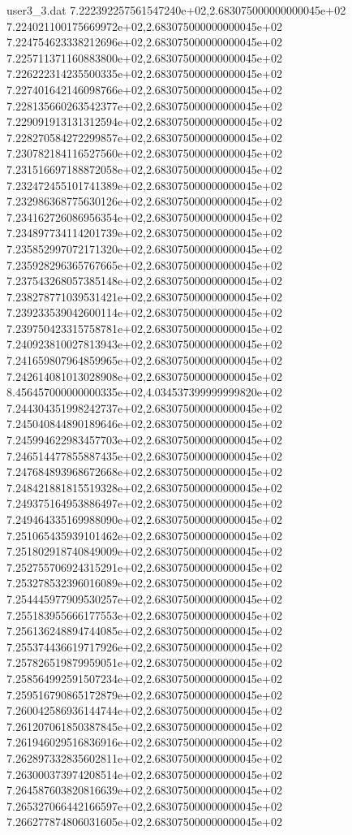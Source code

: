\begin{filecontents}{user3_3.dat}
7.222392257561547240e+02,2.683075000000000045e+02
7.224021100175669972e+02,2.683075000000000045e+02
7.224754623338212696e+02,2.683075000000000045e+02
7.225711371160883800e+02,2.683075000000000045e+02
7.226222314235500335e+02,2.683075000000000045e+02
7.227401642146098766e+02,2.683075000000000045e+02
7.228135660263542377e+02,2.683075000000000045e+02
7.229091913131312594e+02,2.683075000000000045e+02
7.228270584272299857e+02,2.683075000000000045e+02
7.230782184116527560e+02,2.683075000000000045e+02
7.231516697188872058e+02,2.683075000000000045e+02
7.232472455101741389e+02,2.683075000000000045e+02
7.232986368775630126e+02,2.683075000000000045e+02
7.234162726086956354e+02,2.683075000000000045e+02
7.234897734114201739e+02,2.683075000000000045e+02
7.235852997072171320e+02,2.683075000000000045e+02
7.235928296365767665e+02,2.683075000000000045e+02
7.237543268057385148e+02,2.683075000000000045e+02
7.238278771039531421e+02,2.683075000000000045e+02
7.239233539042600114e+02,2.683075000000000045e+02
7.239750423315758781e+02,2.683075000000000045e+02
7.240923810027813943e+02,2.683075000000000045e+02
7.241659807964859965e+02,2.683075000000000045e+02
7.242614081013028908e+02,2.683075000000000045e+02
8.456457000000000335e+02,4.034537399999999820e+02
7.244304351998242737e+02,2.683075000000000045e+02
7.245040844890189646e+02,2.683075000000000045e+02
7.245994622983457703e+02,2.683075000000000045e+02
7.246514477855887435e+02,2.683075000000000045e+02
7.247684893968672668e+02,2.683075000000000045e+02
7.248421881815519328e+02,2.683075000000000045e+02
7.249375164953886497e+02,2.683075000000000045e+02
7.249464335169988090e+02,2.683075000000000045e+02
7.251065435939101462e+02,2.683075000000000045e+02
7.251802918740849009e+02,2.683075000000000045e+02
7.252755706924315291e+02,2.683075000000000045e+02
7.253278532396016089e+02,2.683075000000000045e+02
7.254445977909530257e+02,2.683075000000000045e+02
7.255183955666177553e+02,2.683075000000000045e+02
7.256136248894744085e+02,2.683075000000000045e+02
7.255374436619717926e+02,2.683075000000000045e+02
7.257826519879959051e+02,2.683075000000000045e+02
7.258564992591507234e+02,2.683075000000000045e+02
7.259516790865172879e+02,2.683075000000000045e+02
7.260042586936144744e+02,2.683075000000000045e+02
7.261207061850387845e+02,2.683075000000000045e+02
7.261946029516836916e+02,2.683075000000000045e+02
7.262897332835602811e+02,2.683075000000000045e+02
7.263000373974208514e+02,2.683075000000000045e+02
7.264587603820816639e+02,2.683075000000000045e+02
7.265327066442166597e+02,2.683075000000000045e+02
7.266277874806031605e+02,2.683075000000000045e+02

\end{filecontents}
